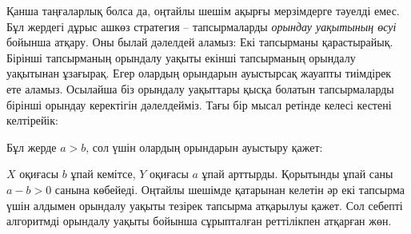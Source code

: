 Қанша таңғаларлық болса да, оңтайлы шешім 
ақырғы мерзімдерге тәуелді емес. Бұл
жердегі дұрыс ашкөз стратегия -- тапсырмаларды
\emph{орындау уақытының өсуі} бойынша атқару.
Оны былай дәлелдей аламыз:
Екі тапсырманы қарастырайық.
Бірінші тапсырманың орындалу уақыты екінші тапсырманың
орындалу уақытынан ұзағырақ.
Егер олардың орындарын ауыстырсақ жауапты тиімдірек 
ете аламыз.
Осылайша біз орындалу уақыттары қысқа болатын
тапсырмаларды бірінші орындау керектігін дәлелдейміз.
Тағы бір мысал ретінде келесі кестені келтірейік:
\begin{center}
\end{center}
Бұл жерде $a>b$, сол үшін олардың орындарын ауыстыру қажет:
\begin{center}
\end{center}
$X$ оқиғасы $b$ ұпай кемітсе, $Y$ оқиғасы $a$ ұпай арттырды.
Қорытынды ұпай саны $a-b > 0$ санына көбейеді.
Оңтайлы шешімде қатарынан келетін әр екі
тапсырма үшін алдымен орындалу уақыты тезірек 
тапсырма атқарылуы қажет.
Сол себепті алгоритмді орындалу уақыты бойынша
сұрыпталған реттілікпен атқарған жөн.

